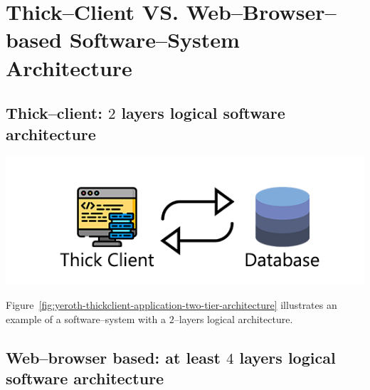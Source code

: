 \chapter{Thick--Client VS. Web--Browser--based Software--System Architecture}

\vspace{-2em}


\vspace{1em}

\section{Thick--client: $2$ layers logical software architecture}

\begin{center}
\includegraphics[scale=0.52]{images/yeroth-thickclient-application-two-tier-architecture.png}
\label{fig:yeroth-thickclient-application-two-tier-architecture}
\end{center}

Figure~\ref{fig:yeroth-thickclient-application-two-tier-architecture}
illustrates an example of a \thickclient
software--system with a $2$--layers
logical architecture.


\section{Web--browser based: at least $4$ layers logical software architecture}

